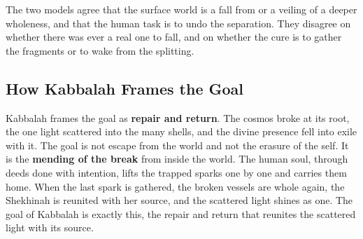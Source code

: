 The two models agree that the surface world is a fall from or a veiling of a deeper
wholeness, and that the human task is to undo the separation. They disagree on
whether there was ever a real one to fall, and on whether the cure is to gather
the fragments or to wake from the splitting.

\subsection{How Kabbalah Frames the Goal}

Kabbalah frames the goal as \textbf{repair and return}. The cosmos broke at its
root, the one light scattered into the many shells, and the divine presence fell
into exile with it. The goal is not escape from the world and not the erasure of
the self. It is the \textbf{mending of the break} from inside the world. The human
soul, through deeds done with intention, lifts the trapped sparks one by one and
carries them home. When the last spark is gathered, the broken vessels are whole
again, the Shekhinah is reunited with her source, and the scattered light shines
as one. The goal of Kabbalah is exactly this, the repair and return that reunites
the scattered light with its source.
